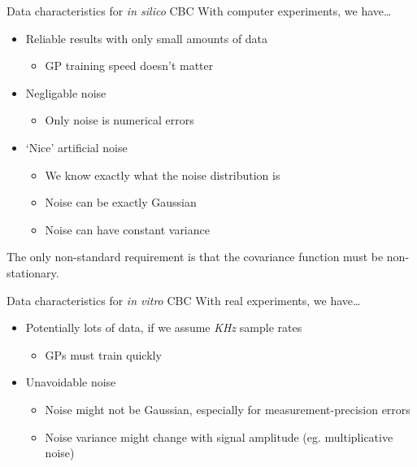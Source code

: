 \documentclass[presentation]{beamer}
\begin{document}
\begin{frame}[label={sec:org669b97f}]{Data characteristics for \emph{in silico} CBC}
With computer experiments, we have\ldots{}

\vfill

\begin{itemize}
\item Reliable results with only small amounts of data
\begin{itemize}
\item GP training speed doesn't matter
\end{itemize}
\item Negligable noise
\begin{itemize}
\item Only noise is numerical errors
\end{itemize}
\item `Nice' artificial noise
\begin{itemize}
\item We know exactly what the noise distribution is
\item Noise can be exactly Gaussian
\item Noise can have constant variance
\end{itemize}
\end{itemize}

The only non-standard requirement is that the covariance function must be non-stationary.
\end{frame}

\begin{frame}[label={sec:org3698cd0}]{Data characteristics for \emph{in vitro} CBC}
With real experiments, we have\ldots{}

\vfill

\begin{itemize}
\item Potentially lots of data, if we assume \emph{KHz} sample rates
\begin{itemize}
\item GPs must train quickly
\end{itemize}
\item Unavoidable noise
\begin{itemize}
\item Noise might not be Gaussian, especially for measurement-precision errors
\item Noise variance might change with signal amplitude (eg. multiplicative noise)
\end{itemize}
\end{itemize}
\end{frame}
\end{document}
